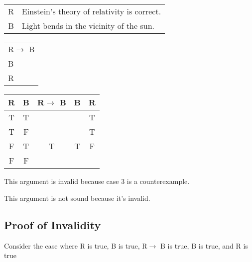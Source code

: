 \section{}
\centering
\begin{tabular}{r l}
    R & Einstein's theory of relativity is correct. \\
    B & Light bends in the vicinity of the sun.
\end{tabular}
\begin{tabular}{l}
    R$\rightarrow$ B\\
    B\\
    \hline
    R
\end{tabular}

\begin{tabular}{c|c||c|c||c}
    R & B & R$\rightarrow$ B & B & R \\
    \hline
    T & T &   &   & T \\
    T & F &   &   & T \\
    F & T & T & T & F \\
    F & F &   &   &  
\end{tabular}

\justifying
\noindent This argument is invalid because case 3 is a counterexample.

\noindent This argument is not sound because it's invalid.

\subsection*{Proof of Invalidity}
Consider the case where R is true, B is true, R$\rightarrow$ B is true, B is true, and R is true
